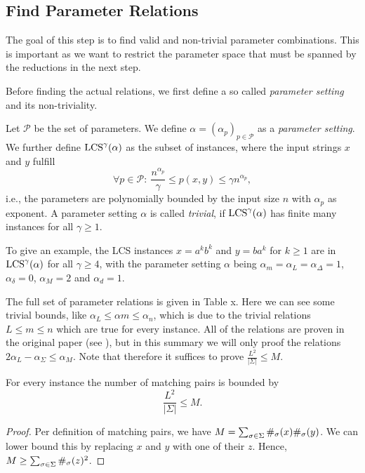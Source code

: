 \subsection{Find Parameter Relations}
The goal of this step is to find valid and non-trivial parameter combinations.
This is important as we want to restrict the parameter space that must be spanned by the reductions in the next step.

Before finding the actual relations, we first define a so called \emph{parameter setting} and its non-triviality.

\begin{definition}
Let $\mathcal{P}$ be the set of parameters.
We define $\mathbb{\alpha} = (\alpha_p)_{p \in \mathcal{P}}$ as a \emph{parameter setting}.
We further define $\text{LCS}^\gamma(\mathbb{\alpha})$ as the subset of \lcs{} instances, where the input strings $x$ and $y$ fulfill
\begin{displaymath}
	\forall p \in \mathcal{P}: \  \frac{n^{\alpha_p}}{\gamma} \leq p(x,y) \leq \gamma n^{\alpha_p},
\end{displaymath}
i.e., the parameters are polynomially bounded by the input size $n$ with $\alpha_p$ as exponent.
A parameter setting $\mathbb{\alpha}$ is called \emph{trivial}, if $\text{LCS}^\gamma(\alpha)$ has finite many instances for all $\gamma \geq 1$.
\end{definition}
%
To give an example, the LCS instances $x=a^{k}b^{k}$ and $y = ba^k$ for $k\geq 1$ are in $\text{LCS}^\gamma(\mathbb{\alpha})$ for all $\gamma \geq 4$, with the parameter setting $\mathbb{\alpha}$ being $\alpha_m = \alpha_L = \alpha_\Delta = 1$, $\alpha_\delta = 0$, $\alpha_M = 2$ and $\alpha_d = 1$.


The full set of parameter relations is given in Table x.
Here we can see some trivial bounds, like $\alpha_L \leq \alpha m \leq \alpha_n$, which is due to the trivial relations $L \leq m \leq n$ which are true for every \lcs{} instance.
All of the relations are proven in the original paper (see \cite[section 6]{Bringman.2018}), but in this summary we will only proof the relations $2\alpha_L - \alpha_\Sigma \leq \alpha_M$.
Note that therefore it suffices to prove $\frac{L^2}{|\Sigma|} \leq M$.

\begin{theorem}
For every \lcs{} instance the number of matching pairs is bounded by
\begin{displaymath}
	\dfrac{L^2}{|\Sigma|} \leq M .
\end{displaymath}
\end{theorem}

\begin{proof}
Per definition of matching pairs, we have $M = \sum_{\sigma \in \Sigma} \#_{\sigma}(x) \#_{\sigma}(y)$.
We can lower bound this by replacing $x$ and $y$ with one of their \lcs{} $z$.
Hence, $M \geq \sum_{\sigma \in \Sigma} \#_{\sigma}(z)^2$.
\end{proof}



